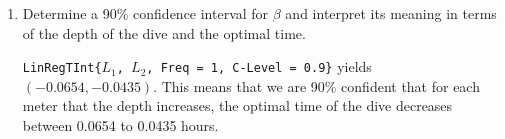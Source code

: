 \documentclass[10pt]{article}
\begin{document}
\begin{enumerate}
\begin{enumerate}
	\item Determine a 90\% confidence interval for $\beta$ and interpret its meaning in terms of the depth of the dive and the optimal time. 
	
	{\answer \texttt{LinRegTInt\{$L_1$, $L_2$, Freq = 1, C-Level = 0.9\}} yields $(-0.0654, -0.0435)$.  This means that we are 90\% confident that for each meter that the depth increases, the optimal time of the dive decreases between 0.0654 to 0.0435 hours.} 
	\end{enumerate}

\end{enumerate}	

\vfill
\end{document}
